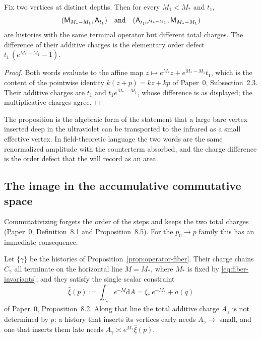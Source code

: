 \begin{proposition}
\label{prop:distributive-resummation}
Fix two vertices at distinct depths.  Then for every $M_1<M_*$ and $t_1$,
\[
  (\mathsf M_{M_*-M_1},\mathsf A_{t_1})\quad\text{and}\quad
  (\mathsf A_{t_1e^{M_*-M_1}},\mathsf M_{M_*-M_1})
\]
are histories with the same terminal operator but different total charges.  The
difference of their additive charges is the elementary order defect
$t_1\,(e^{M_*-M_1}-1)$.
\end{proposition}

\begin{proof}
Both words evaluate to the affine map $z\mapsto e^{M_*}z+e^{M_*-M_1}t_1$, which
is the content of the pointwise identity $k(z+p)=kz+kp$ of Paper~0,
Subsection~2.3.  Their additive charges are $t_1$ and $t_1e^{M_*-M_1}$, whose
difference is as displayed; the multiplicative charges agree.
\end{proof}

The proposition is the algebraic form of the statement that a large bare vertex
inserted deep in the ultraviolet can be transported to the infrared as a small
effective vertex.  In field-theoretic language the two words are the same
renormalized amplitude with the counterterm absorbed, and the charge difference
is the order defect that the \ACS{} will record as an area.

\subsection{The image in the accumulative commutative space}

Commutativizing forgets the order of the steps and keeps the two total charges
(Paper~0, Definition~8.1 and Proposition~8.5).  For the $p_0\to p$ family this has
an immediate consequence.

\begin{proposition}
\label{prop:acs-fanout}
Let $\{\gamma\}$ be the histories of Proposition~\ref{prop:operator-fiber}.
Their \ACS{} charge chains $C_\gamma$ all terminate on the horizontal line
$M=M_*$, where $M_*$ is fixed by \eqref{eq:fiber-invariants}, and they satisfy
the single scalar constraint
\begin{equation}\label{eq:fanout-constraint}
  \hat\xi(p):=\int_{C_\gamma}e^{-M}\mathrm dA
  =\xi_*\,e^{-M_*}+a(q)
\end{equation}
of Paper~0, Proposition~8.2.  Along that line the total additive charge
$A_\gamma$ is not determined by $p$: a history that inserts its vertices early
needs $A_\gamma\to$ small, and one that inserts them late needs
$A_\gamma\asymp e^{M_*}\hat\xi(p)$.
\end{proposition}

